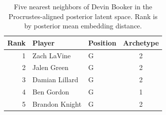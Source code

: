 \begin{table}[htbp]
  \centering\small
  \begin{tabular}{rllc}
    \toprule
    Rank & Player & Position & Archetype \\
    \midrule
    1 & Zach LaVine & G & 2 \\
    2 & Jalen Green & G & 2 \\
    3 & Damian Lillard & G & 2 \\
    4 & Ben Gordon & G & 1 \\
    5 & Brandon Knight & G & 2 \\
    \bottomrule
  \end{tabular}
  \caption{Five nearest neighbors of Devin Booker in the Procrustes-aligned posterior latent space. Rank is by posterior mean embedding distance.}
  \label{tab:Devin_Booker_neighbors}
\end{table}

